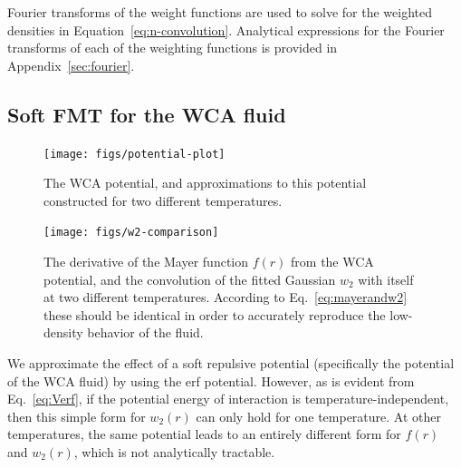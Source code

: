 \documentclass[letterpaper,twocolumn,amsmath,amssymb,prb]{revtex4-1}
\begin{document}
Fourier transforms of the weight functions are used to solve for the weighted densities in Equation~\ref{eq:n-convolution}.  Analytical expressions for the Fourier transforms of each of the weighting functions is provided in Appendix~\ref{sec:fourier}.
\subsection{Soft FMT for the WCA fluid}

\begin{figure}
\begin{center}
\texttt{[image: figs/potential-plot]}
\end{center}
\caption{The WCA potential, and approximations to this potential
  constructed for two different temperatures.}
\label{fig:potential-plot}
\end{figure}


\begin{figure}
\begin{center}
\texttt{[image: figs/w2-comparison]}
\end{center}
\caption{The derivative of the Mayer function $f(r)$ from the WCA
  potential, and the convolution of the fitted Gaussian $w_2$ with
  itself at two different temperatures.  According to
  Eq.~\ref{eq:mayerandw2} these should be identical in order to
  accurately reproduce the low-density behavior of the fluid.}
\label{fig:w2-comparison}
\end{figure}


We approximate the effect of a soft repulsive potential
(specifically the potential of the WCA fluid) by using the erf
potential. However, as is evident
from Eq.~\ref{eq:Verf}, if the potential energy of interaction is
temperature-independent, then this simple form for $w_2(r)$ can only hold
for one temperature.  At other temperatures, the same potential leads
to an entirely different form for $f(r)$ and $w_2(r)$, which is not
analytically tractable.
\end{document}
